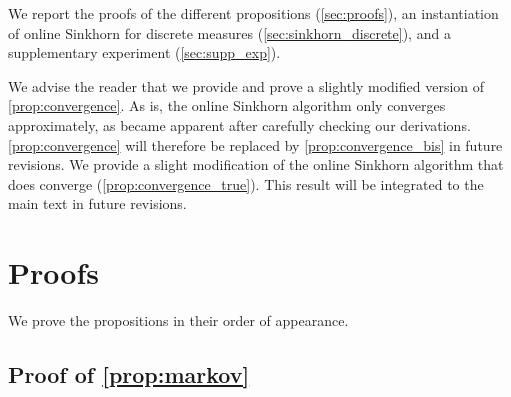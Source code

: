 We report the proofs of the different propositions (\autoref{sec:proofs}), an instantiation of online Sinkhorn for discrete measures (\autoref{sec:sinkhorn_discrete}), and a supplementary experiment (\autoref{sec:supp_exp}).

We advise the reader that we provide and prove a slightly modified version of \autoref{prop:convergence}. As is, the online Sinkhorn algorithm only converges approximately, as became apparent after carefully checking our derivations. \autoref{prop:convergence} will therefore be replaced by \autoref{prop:convergence_bis} in future revisions. We provide a slight modification of the online Sinkhorn algorithm that does converge (\autoref{prop:convergence_true}). This result will be integrated to the main text in future revisions.

\section{Proofs}\label{sec:proofs}

We prove the propositions in their order of appearance.

\subsection{Proof of \autoref{prop:markov}}

